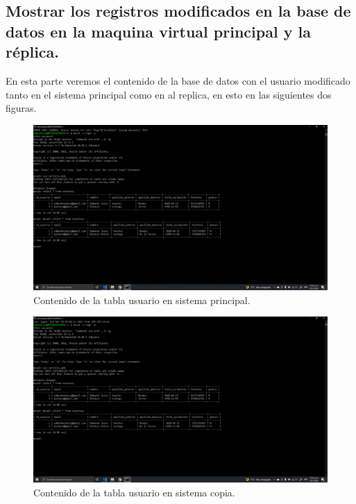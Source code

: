 \documentclass[11pt]{article}
\begin{document}
		\subsection{Mostrar los registros modificados en la base de datos en la maquina virtual principal y la réplica.}
		En esta parte veremos el contenido de la base de datos con el usuario modificado tanto en el sistema principal como en al replica, en esto en las siguientes dos figuras.
		\begin{figure}[H]
			\centering
			\includegraphics[scale=0.34]{resources/p9.6principal.png}
			\caption{Contenido de la tabla usuario en sistema principal.}\label{fig:picture}
		\end{figure}	
		\begin{figure}[H]
			\centering
			\includegraphics[scale=0.34]{resources/p9.6copia.png}
			\caption{Contenido de la tabla usuario en sistema copia.}\label{fig:picture}
		\end{figure}
\end{document}
